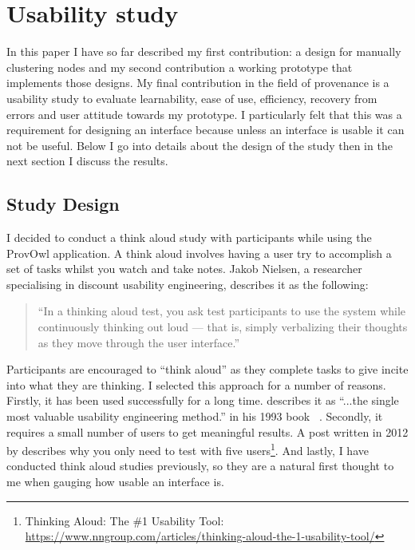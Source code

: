 \chapter{Usability study}

In this paper I have so far described my first contribution: a design for manually clustering nodes and my second contribution a working prototype that implements those designs. My final contribution in the field of provenance is a usability study to evaluate learnability, ease of use, efficiency, recovery from errors and user attitude towards my prototype. I particularly felt that this was a requirement for designing an interface because unless an interface is usable it can not be useful. Below I go into details about the design of the study then in the next section I discuss the results.

\section{Study Design}
\label{sec:study_design}

\label{sec:interview_format}

I decided to conduct a think aloud study with participants while using the ProvOwl application. A think aloud involves having a user try to accomplish a set of tasks whilst you watch and take notes. Jakob Nielsen, a researcher specialising in discount usability engineering, describes it as the following:

\begin{quote}
``In a thinking aloud test, you ask test participants to use the system while continuously thinking out loud — that is, simply verbalizing their thoughts as they move through the user interface.'' 
\end{quote}

Participants are encouraged to ``think aloud'' as they complete tasks to give incite into what they are thinking. I selected this approach for a number of reasons. Firstly, it has been used successfully for a long time. \citeauthor{nielsen1994} describes it as ``...the single most valuable usability engineering method.'' in his 1993 book ~\cite{nielsen1994}. Secondly, it requires a small number of users to get meaningful results. A post written in 2012 by \citeauthor{nielsen1994} describes why you only need to test with five users\footnote{Thinking Aloud: The \#1 Usability Tool: \url{https://www.nngroup.com/articles/thinking-aloud-the-1-usability-tool/}}. And lastly, I have conducted think aloud studies previously, so they are a natural first thought to me when gauging how usable an interface is.

